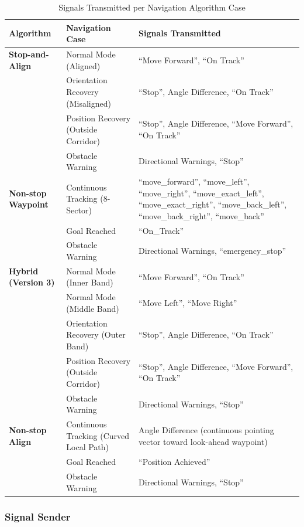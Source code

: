 \documentclass[12pt]{report}
\begin{document}
\begin{table}[H]
\centering
\caption{Signals Transmitted per Navigation Algorithm Case}
\label{tab:algorithm_signals}
\begin{tabular}{@{}p{3.5cm} p{5.0cm} p{6.0cm}@{}}
\toprule
\textbf{Algorithm} & \textbf{Navigation Case} & \textbf{Signals Transmitted} \\
\midrule
\textbf{Stop-and-Align} 
& Normal Mode (Aligned) & ``Move Forward'', ``On Track'' \\
& Orientation Recovery (Misaligned) & ``Stop'', Angle Difference, ``On Track'' \\
& Position Recovery (Outside Corridor) & ``Stop'', Angle Difference, ``Move Forward'', ``On Track'' \\
& Obstacle Warning & Directional Warnings, ``Stop''\\
\midrule
\textbf{Non-stop Waypoint} 
& Continuous Tracking (8-Sector) & ``move\_forward'', ``move\_left'', ``move\_right'', ``move\_exact\_left'', ``move\_exact\_right'', ``move\_back\_left'', ``move\_back\_right'', ``move\_back'' \\
& Goal Reached & ``On\_Track'' \\
& Obstacle Warning & Directional Warnings, ``emergency\_stop'' \\
\midrule
\textbf{Hybrid (Version 3)} 
& Normal Mode (Inner Band) & ``Move Forward'', ``On Track'' \\
& Normal Mode (Middle Band) & ``Move Left'', ``Move Right'' \\
& Orientation Recovery (Outer Band) & ``Stop'', Angle Difference, ``On Track'' \\
& Position Recovery (Outside Corridor) & ``Stop'', Angle Difference, ``Move Forward'', ``On Track'' \\
& Obstacle Warning & Directional Warnings, ``Stop'' \\
\midrule
\textbf{Non-stop Align}
& Continuous Tracking (Curved Local Path) & Angle Difference (continuous pointing vector toward look-ahead waypoint) \\
& Goal Reached & ``Position Achieved'' \\
& Obstacle Warning & Directional Warnings, ``Stop'' \\
\bottomrule
\end{tabular}
\end{table}

\subsubsection{Signal Sender}
\end{document}
